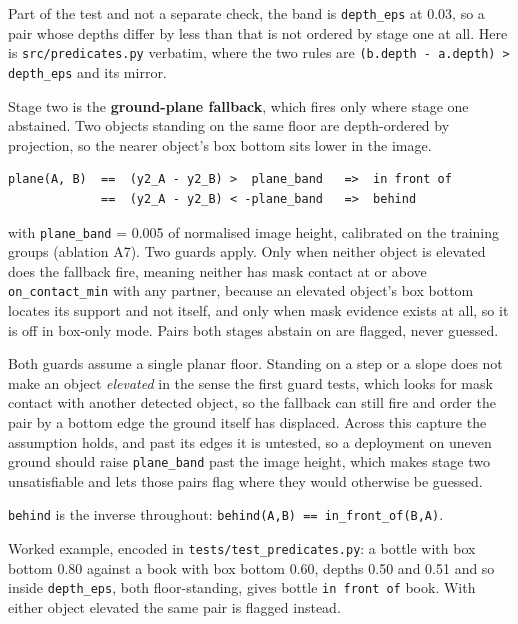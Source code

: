 Part of the test and not a separate check, the band is \texttt{depth\_\allowbreak{}eps} at 0.03, so a pair whose depths differ by less than that is not ordered by stage one at all. Here is \texttt{src/predicates.py} verbatim, where the two rules are \texttt{(b.depth - a.depth) > depth\_\allowbreak{}eps} and its mirror.

Stage two is the \textbf{ground-plane fallback}, which fires only where stage one abstained. Two objects standing on the same floor are depth-ordered by projection, so the nearer object's box bottom sits lower in the image.

\begingroup\small\begin{verbatim}
plane(A, B)  ==  (y2_A - y2_B) >  plane_band   =>  in front of
             ==  (y2_A - y2_B) < -plane_band   =>  behind
\end{verbatim}\endgroup

with \texttt{plane\_\allowbreak{}band} = 0.005 of normalised image height, calibrated on the training groups (ablation A7). Two guards apply. Only when neither object is elevated does the fallback fire, meaning neither has mask contact at or above \texttt{on\_\allowbreak{}contact\_\allowbreak{}min} with any partner, because an elevated object's box bottom locates its support and not itself, and only when mask evidence exists at all, so it is off in box-only mode. Pairs both stages abstain on are flagged, never guessed.

Both guards assume a single planar floor. Standing on a step or a slope does not make an object \textit{elevated} in the sense the first guard tests, which looks for mask contact with another detected object, so the fallback can still fire and order the pair by a bottom edge the ground itself has displaced. Across this capture the assumption holds, and past its edges it is untested, so a deployment on uneven ground should raise \texttt{plane\_\allowbreak{}band} past the image height, which makes stage two unsatisfiable and lets those pairs flag where they would otherwise be guessed.

\texttt{behind} is the inverse throughout: \texttt{behind(A,B) == in\_\allowbreak{}front\_\allowbreak{}of(B,A)}.

Worked example, encoded in \texttt{tests/test\_\allowbreak{}predicates.py}: a bottle with box bottom 0.80 against a book with box bottom 0.60, depths 0.50 and 0.51 and so inside \texttt{depth\_\allowbreak{}eps}, both floor-standing, gives bottle \texttt{in front of} book. With either object elevated the same pair is flagged instead.

